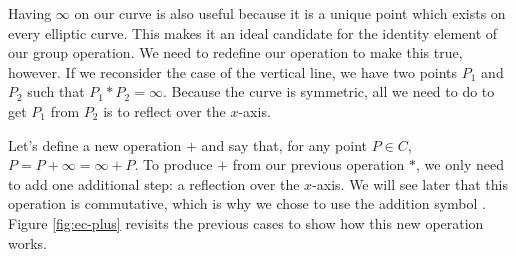 \documentclass{article}
\begin{document}
Having $\infty$ on our curve is also useful because it is a unique point which exists on every elliptic curve.
This makes it an ideal candidate for the identity element of our group operation.
We need to redefine our operation to make this true, however.
If we reconsider the case of the vertical line, we have two points $P_1$ and $P_2$ such that $P_1 * P_2 = \infty$.
Because the curve is symmetric, all we need to do to get $P_1$ from $P_2$ is to reflect over the $x$-axis.

Let's define a new operation $+$ and say that, for any point $P \in C$, $P = P+\infty = \infty+P$.
To produce $+$ from our previous operation $*$, we only need to add one additional step: a reflection over the $x$-axis.
We will see later that this operation is commutative, which is why we chose to use the addition symbol \cite[$\S$2.2]{washington}.
Figure \ref{fig:ec-plus} revisits the previous cases to show how this new operation works.
\end{document}
